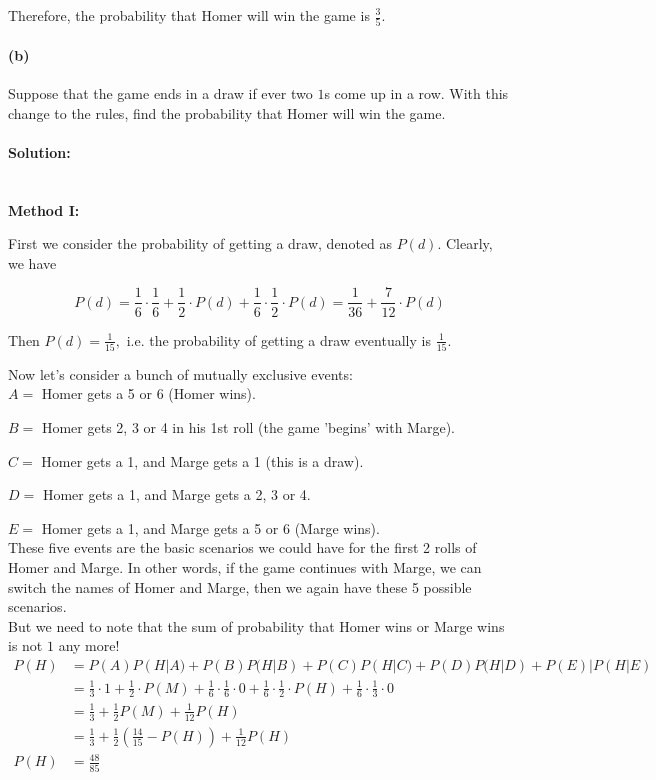 \documentclass[a4paper, 11pt, twoside]{article}
\begin{document}
Therefore, the probability that Homer will win the game is $\frac35.$

\paragraph{(b)} Suppose that the game ends in a draw if ever two $1$s come up in a row. With this change to the rules, find the probability that Homer will win the game.

\paragraph{Solution:}\ \\

\textbf{Method I:}

First we consider the probability of getting a draw, denoted as $P(d)$. Clearly, we have

\[P(d) = \frac16\cdot\frac16 + \frac12\cdot P(d) +\frac16\cdot\frac12\cdot P(d)=\frac1{36}+\frac7{12}\cdot P(d)\]

Then $P(d)=\frac{1}{15},$ i.e. the probability of getting a draw eventually is $\frac{1}{15}.$

Now let's consider a bunch of mutually exclusive events:\\

$A=$ Homer gets a 5 or 6 (Homer wins).

$B=$ Homer gets 2, 3 or 4 in his 1st roll (the game 'begins' with Marge).

$C=$ Homer gets a 1, and Marge gets a 1 (this is a draw).

$D=$ Homer gets a 1, and Marge gets a 2, 3 or 4.

$E=$ Homer gets a 1, and Marge gets a 5 or 6 (Marge wins).\\

These five events are the basic scenarios we could have for the first 2 rolls of Homer and Marge. In other words, if the game continues with Marge, we can switch the names of Homer and Marge, then we again have these 5 possible scenarios.\\

But we need to note that the sum of probability that Homer wins or Marge wins is not $1$ any more!\\

\[
\begin{split}
	P(H)&=P(A)P(H|A)+P(B)P(H|B)+P(C)P(H|C)+P(D)P(H|D)+P(E)|P(H|E)\\
	&=\frac{1}{3}\cdot 1 + \frac{1}{2}\cdot P(M) + \frac{1}{6}\cdot\frac{1}{6}\cdot 0 + \frac{1}{6}\cdot\frac{1}{2}\cdot P(H)+\frac{1}{6}\cdot\frac{1}{3}\cdot 0\\
	&=\frac{1}{3} + \frac{1}{2}P(M)+\frac{1}{12}P(H)\\
	&=\frac{1}{3} + \frac{1}{2}(\frac{14}{15}- P(H))+\frac{1}{12}P(H)\\
	P(H)&=\frac{48}{85}
\end{split}
\]
\end{document}
